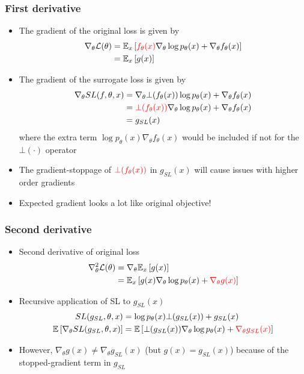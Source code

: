 \documentclass{beamer}
\begin{document}
\begin{frame}
\frametitle{First derivative}
\begin{itemize}
\item The gradient of the original loss is given by
\begin{align*}
\nabla_\theta \mathcal{L}(\theta)
&= \mathbb{E}_{x}\left[\mathbin{\color{red}{f_\theta(x)}}\nabla_\theta \log p_\theta(x) + \nabla_\theta f_\theta(x)\right]\\
&=\mathbb{E}_{x}\left[g(x)\right]
\end{align*}
\item The gradient of the surrogate loss is given by
\begin{align*}
\nabla_\theta SL(f, \theta, x)
&= \nabla_\theta \bot(f_\theta(x))\log p_\theta(x) + \nabla_\theta f_\theta(x)\\
&= \mathbin{\color{red}{\bot(f_\theta(x))}}
    \nabla_\theta \log p_\theta(x) + \nabla_\theta f_\theta(x)\\
&= g_{SL}(x)
\end{align*}
where the extra term $\log p_\theta(x) \nabla_\theta f_\theta(x)$ 
would be included if not for the $\bot(\cdot)$ operator
\item The gradient-stoppage of $\mathbin{\color{red}{\bot(f_\theta(x))}}$ in $g_{SL}(x)$
will cause issues with higher order gradients
\item Expected gradient looks a lot like original objective!
\end{itemize}
\end{frame}

\begin{frame}
\frametitle{Second derivative}
\begin{itemize}
\item Second derivative of original loss
\begin{align*}
\nabla^2_\theta \mathcal{L}(\theta) &= \nabla_\theta\mathbb{E}_{x}\left[g(x)\right]\\
&= \mathbb{E}_{x}\left[g(x)\nabla_\theta\log p_\theta(x) + \mathbin{\color{red}{\nabla_\theta g(x)}}\right]
\end{align*}
\item Recursive application of SL to $g_{SL}(x)$
\begin{align*}
SL(g_{SL}, \theta, x) &= \log p_\theta(x)\bot(g_{SL}(x)) + g_{SL}(x)\\
\mathbb{E}\left[\nabla_\theta SL(g_{SL}, \theta, x)\right]
&= \mathbb{E}\left[\bot(g_{SL}(x))\nabla_\theta\log p_\theta(x) + \mathbin{\color{red}{\nabla_\theta g_{SL}(x)}}\right]
\end{align*}
\item However, $\nabla_\theta g(x) \neq \nabla_\theta g_{SL}(x)$
(but $g(x) = g_{SL}(x)$)
because of the stopped-gradient term in $g_{SL}$
\end{itemize}
\end{frame}
\end{document}
